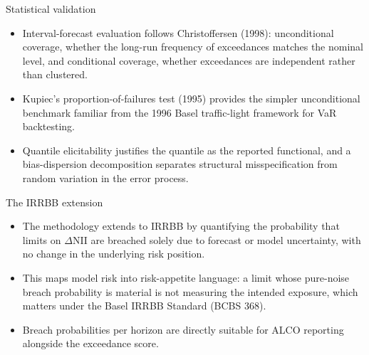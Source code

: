 \documentclass[aspectratio=169,11pt]{beamer}
\begin{document}
\begin{frame}{Statistical validation}
  \begin{itemize}
    \item Interval-forecast evaluation follows Christoffersen (1998):
          unconditional coverage, whether the long-run frequency of
          exceedances matches the nominal level, and conditional coverage,
          whether exceedances are independent rather than clustered.
    \item Kupiec's proportion-of-failures test (1995) provides the simpler
          unconditional benchmark familiar from the 1996 Basel traffic-light
          framework for VaR backtesting.
    \item Quantile elicitability justifies the quantile as the reported
          functional, and a bias-dispersion decomposition separates
          structural misspecification from random variation in the error
          process.
  \end{itemize}
\end{frame}

\begin{frame}{The IRRBB extension}
  \begin{itemize}
    \item The methodology extends to IRRBB by quantifying the probability
          that limits on $\Delta$NII are breached solely due to forecast or
          model uncertainty, with no change in the underlying risk position.
    \item This maps model risk into risk-appetite language: a limit whose
          pure-noise breach probability is material is not measuring the
          intended exposure, which matters under the Basel IRRBB Standard
          (BCBS 368).
    \item Breach probabilities per horizon are directly suitable for ALCO
          reporting alongside the exceedance score.
  \end{itemize}
\end{frame}
\end{document}
